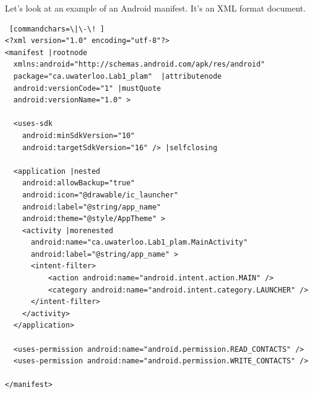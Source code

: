 Let's look at an example of an Android manifest. It's an XML format
document.



\newpage

{\scriptsize
\def\rootnode{\tikz[remember picture] \node[yshift=-.8em] (root) {};}  
\def\attributenode{\tikz[remember picture] \node[yshift=-.8em] (attribute) {};}  
\def\mustQuote{\tikz[remember picture] \node[yshift=-.8em] (mustQuote) {};}  
\def\selfclosing{\tikz[remember picture] \node[yshift=-.8em] (selfclosing) {};}  
\def\nested{\tikz[remember picture] \node[yshift=-.8em] (nested) {};}  
\def\morenested{\tikz[remember picture] \node[yshift=-.8em] (moreNested) {};}  

\begin{Verbatim} [commandchars=\|\-\! ]
<?xml version="1.0" encoding="utf-8"?>
<manifest |rootnode
  xmlns:android="http://schemas.android.com/apk/res/android"
  package="ca.uwaterloo.Lab1_plam"  |attributenode
  android:versionCode="1" |mustQuote
  android:versionName="1.0" >

  <uses-sdk
    android:minSdkVersion="10"
    android:targetSdkVersion="16" /> |selfclosing

  <application |nested
    android:allowBackup="true"
    android:icon="@drawable/ic_launcher"
    android:label="@string/app_name"
    android:theme="@style/AppTheme" >
    <activity |morenested
      android:name="ca.uwaterloo.Lab1_plam.MainActivity"
      android:label="@string/app_name" >
      <intent-filter>
          <action android:name="android.intent.action.MAIN" />
          <category android:name="android.intent.category.LAUNCHER" />
      </intent-filter>
    </activity>
  </application>

  <uses-permission android:name="android.permission.READ_CONTACTS" /> 
  <uses-permission android:name="android.permission.WRITE_CONTACTS" />

</manifest>
\end{Verbatim}
}
